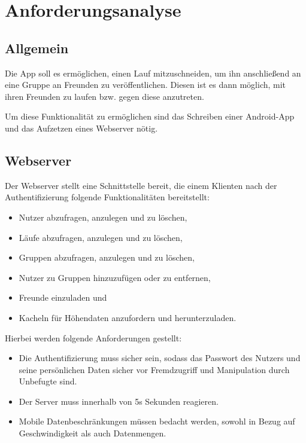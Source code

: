 \section{Anforderungsanalyse}\label{kapitel1}
\subsection{Allgemein}
Die App soll es ermöglichen, einen Lauf mitzuschneiden, um ihn anschließend an eine Gruppe an Freunden zu veröffentlichen. Diesen ist es dann möglich, mit ihren Freunden zu laufen bzw. gegen diese anzutreten. 

Um diese Funktionalität zu ermöglichen sind das Schreiben einer Android-App und das Aufzetzen eines Webserver nötig.

\subsection{Webserver}

Der Webserver stellt eine Schnittstelle bereit, die einem Klienten nach der Authentifizierung folgende Funktionalitäten bereitstellt:
\begin{itemize}
\item Nutzer abzufragen, anzulegen und zu löschen,
\item Läufe abzufragen, anzulegen und zu löschen,
\item Gruppen abzufragen, anzulegen und zu löschen,
\item Nutzer zu Gruppen hinzuzufügen oder zu entfernen,
\item Freunde einzuladen und
\item Kacheln für Höhendaten anzufordern und herunterzuladen.
\end{itemize}
\vspace{\baselineskip}

Hierbei werden folgende Anforderungen gestellt:
\begin{itemize}
\item Die Authentifizierung muss sicher sein, sodass das Passwort des Nutzers und seine persönlichen Daten sicher vor Fremdzugriff und Manipulation durch Unbefugte sind.
\item Der Server muss innerhalb von 5s Sekunden reagieren.
\item Mobile Datenbeschränkungen müssen bedacht werden, sowohl in Bezug auf Geschwindigkeit als auch Datenmengen.
\end{itemize}


